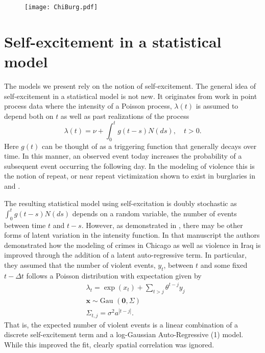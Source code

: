 \documentclass[11pt]{isuthesis}
\begin{document}
\begin{figure}[h] %
	\begin{center}
		\vspace{6pc}
		\texttt{[image: ChiBurg.pdf]}
		\label{ChiSpread}
	\end{center}
\end{figure} 




\section{Self-excitement in a statistical model}
The models we present rely on the notion of self-excitement.  The general idea of self-excitement in a statistical model is not new.  It originates from \cite{hawkes1971spectra} work in point process data where the intensity of a Poisson process, $\lambda(t)$ is assumed to depend both on $t$ as well as past realizations of the process
\begin{equation}
\lambda(t)=\nu + \int_{0}^t g(t-s)N(ds),\quad t>0.
\end{equation}
Here $g(t)$ can be thought of as a triggering function that generally decays over time.  In this manner, an observed event today increases the probability of a subsequent event occurring the following day.  In the modeling of violence this is the notion of repeat, or near repeat victimization shown to exist in burglaries in \cite{johnson1997new} and \cite{johnson2007space}. 

The resulting statistical model using self-excitation is doubly stochastic as $\int_{0}^t g(t-s)N(ds)$ depends on a random variable, the number of events between time $t$ and $t-s$.  However, as demonstrated in \cite{mohler2013modeling}, there may be other forms of latent variation in the intensity function.  In that manuscript the authors demonstrated how the modeling of crimes in Chicago as well as violence in Iraq is improved through the addition of a latent auto-regressive term.  In particular, they assumed that the number of violent events, $y_t$, between $t$ and some fixed $t-\Delta t$ follows a Poisson distribution with expectation given by
\begin{align}
& \lambda_t  =\exp(x_t)+\sum_{t>j} \theta^{t-j} y_j\\
& \boldsymbol{x} \sim \mbox{Gau }(\boldsymbol{0},\Sigma)\\
& \Sigma_{t,j} =\sigma^2 a^{|t-j|}.
\end{align}
That is, the expected number of violent events is a linear combination of a discrete self-excitement term and a log-Gaussian Auto-Regressive (1) model.  While this improved the fit, clearly spatial correlation was ignored.
\end{document}
